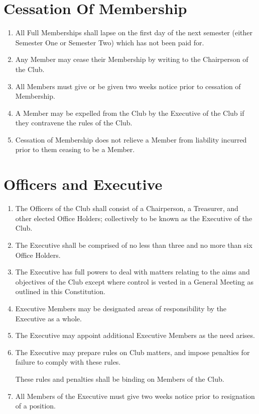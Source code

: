 \documentclass[a4paper]{article}
\begin{document}
	\section{Cessation Of Membership}
	
	\begin{enumerate}
		\item All Full Memberships shall lapse on the first day of the next semester (either Semester One or Semester Two) which has not been paid for.
		
		\item \label{cease-by-writing} Any Member may cease their Membership by writing to the Chairperson of the Club.
		
		\item All Members must give or be given two weeks notice prior to cessation of Membership.
		
		\item \label{cease-by-expulsion} A Member may be expelled from the Club by the Executive of the Club if they contravene the rules of the Club.
		
		\item Cessation of Membership does not relieve a Member from liability incurred prior to them ceasing to be a Member.
	\end{enumerate}

	\section{Officers and Executive}
	
	\begin{enumerate}
		\item The Officers of the Club shall consist of a Chairperson, a Treasurer, and other elected Office Holders; collectively to be known as the Executive of the Club.
		
		\item The Executive shall be comprised of no less than three and no more than six Office Holders.
		
		\item The Executive has full powers to deal with matters relating to the aims and objectives of the Club except where control is vested in a General Meeting as outlined in this Constitution.
		
		\item Executive Members may be designated areas of responsibility by the Executive as a whole.
		
		\item The Executive may appoint additional Executive Members as the need arises.
		
		\item The Executive may prepare rules on Club matters, and impose penalties for failure to comply with these rules.
		
		These rules and penalties shall be binding on Members of the Club.
		\item All Members of the Executive must give two weeks notice prior to resignation of a position.
	\end{enumerate}
	
\end{document}
